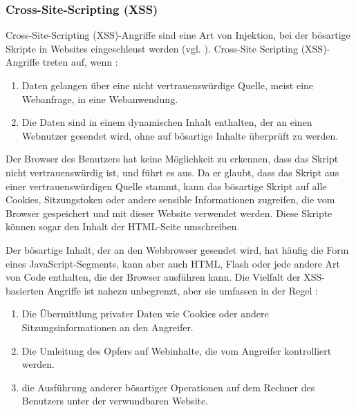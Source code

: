 \subsubsection{Cross-Site-Scripting (XSS)}

Cross-Site-Scripting (XSS)-Angriffe sind eine Art von
Injektion, bei der bösartige Skripte in Websites
eingeschleust werden (vgl. \cite{xss}). Cross-Site
Scripting (XSS)-Angriffe treten auf, wenn :

\begin{enumerate}
    \item Daten gelangen über eine nicht vertrauenswürdige
    Quelle, meist eine Webanfrage, in eine Webanwendung.
    \item Die Daten sind in einem dynamischen Inhalt
    enthalten, der an einen Webnutzer gesendet wird,
    ohne auf bösartige Inhalte überprüft zu werden.
\end{enumerate}

Der Browser des Benutzers hat keine Möglichkeit zu erkennen,
dass das Skript nicht vertrauenswürdig ist, und führt es
aus. Da er glaubt, dass das Skript aus einer
vertrauenswürdigen Quelle stammt, kann das bösartige
Skript auf alle Cookies, Sitzungstoken oder andere
sensible Informationen zugreifen, die vom Browser
gespeichert und mit dieser Website verwendet werden.
Diese Skripte können sogar den Inhalt der HTML-Seite
umschreiben.


Der bösartige Inhalt, der an den Webbrowser gesendet
wird, hat häufig die Form eines JavaScript-Segments,
kann aber auch HTML, Flash oder jede andere Art von
Code enthalten, die der Browser ausführen kann. Die
Vielfalt der XSS-basierten Angriffe ist nahezu unbegrenzt,
aber sie umfassen in der Regel :

\begin{enumerate}
    \item Die Übermittlung privater Daten wie Cookies oder
    andere Sitzungsinformationen an den Angreifer.
    \item Die Umleitung des Opfers auf Webinhalte,
    die vom Angreifer kontrolliert werden.
    \item die Ausführung anderer bösartiger Operationen auf
    dem Rechner des Benutzers unter der verwundbaren Website.
\end{enumerate}
